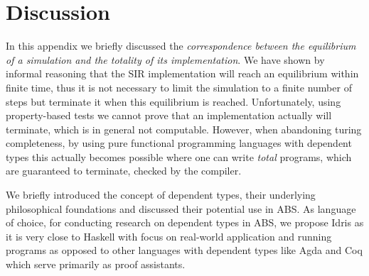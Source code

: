 

\section{Discussion}
In this appendix we briefly discussed the \textit{correspondence between the equilibrium of a simulation and the totality of its implementation}. We have shown by informal reasoning that the SIR implementation will reach an equilibrium within finite time, thus it is not necessary to limit the simulation to a finite number of steps but terminate it when this equilibrium is reached. Unfortunately, using property-based tests we cannot prove that an implementation actually will terminate, which is in general not computable. However, when abandoning turing completeness, by using pure functional programming languages with dependent types this actually becomes possible where one can write \textit{total} programs, which are guaranteed to terminate, checked by the compiler.

We briefly introduced the concept of dependent types, their underlying philosophical foundations and discussed their potential use in ABS. As language of choice, for conducting research on dependent types in ABS, we propose Idris \cite{brady_idris_2013} as it is very close to Haskell with focus on real-world application and running programs as opposed to other languages with dependent types like Agda and Coq which serve primarily as proof assistants.

